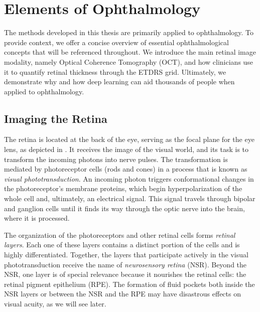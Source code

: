 
\section{Elements of Ophthalmology}
\label{sec:ophthalmology}


The methods developed in this thesis are primarily applied to ophthalmology. To provide context, we offer a concise overview of essential ophthalmological concepts that will be referenced throughout. We introduce the main retinal image modality, namely Optical Coherence Tomography (OCT), and how clinicians use it to quantify retinal thickness through the ETDRS grid. Ultimately, we demonstrate why and how deep learning can aid thousands of people when applied to ophthalmology.

\subsection{Imaging the Retina}
The retina is located at the back of the eye, serving as the focal plane for the eye lens, as depicted in . It receives the image of the visual world, and its task is to transform the incoming photons into nerve pulses. The transformation is mediated by photoreceptor cells (rods and cones) in a process that is known as \textit{visual phototransduction}. An incoming photon triggers conformational changes in the photoreceptor's membrane proteins, which begin hyperpolarization of the whole cell and, ultimately, an electrical signal. This signal travels through bipolar and ganglion cells until it finds its way through the optic nerve into the brain, where it is processed.

The organization of the photoreceptors and other retinal cells forms \textit{retinal layers}. Each one of these layers contains a distinct portion of the cells and is highly differentiated. Together, the layers that participate actively in the visual phototransduction receive the name of \textit{neurosensory retina} (NSR). Beyond the NSR, one layer is of special relevance because it nourishes the retinal cells: the retinal pigment epithelium (RPE). The formation of fluid pockets both inside the NSR layers or between the NSR and the RPE may have disastrous effects on visual acuity, as we will see later.

